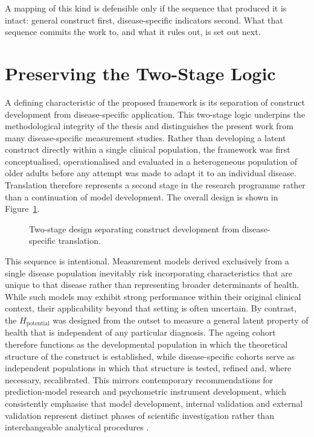 A mapping of this kind is defensible only if the sequence that produced it is
intact: general construct first, disease-specific indicators second. What that
sequence commits the work to, and what it rules out, is set out next.

\section{Preserving the Two-Stage Logic}
\label{sec:two_stage}

\noindent A defining characteristic of the proposed framework is its separation of construct development from disease-specific application. This two-stage logic underpins the methodological integrity of the thesis and distinguishes the present work from many disease-specific measurement studies. Rather than developing a latent construct directly within a single clinical population, the framework was first conceptualised, operationalised and evaluated in a heterogeneous population of older adults before any attempt was made to adapt it to an individual disease. Translation therefore represents a second stage in the research programme rather than a continuation of model development. The overall design is shown in Figure~\ref{fig:two_stage}.

\begin{figure}[htbp]
\centering

\captionsetup{justification=justified, width=\linewidth}
\caption{Two-stage design separating construct development from disease-specific translation.}
\label{fig:two_stage}
\end{figure}

This sequence is intentional. Measurement models derived exclusively from a single disease population inevitably risk incorporating characteristics that are unique to that disease rather than representing broader determinants of health. While such models may exhibit strong performance within their original clinical context, their applicability beyond that setting is often uncertain. By contrast, the $H_{\text{potential}}$ was designed from the outset to measure a general latent property of health that is independent of any particular diagnosis. The ageing cohort therefore functions as the developmental population in which the theoretical structure of the construct is established, while disease-specific cohorts serve as independent populations in which that structure is tested, refined and, where necessary, recalibrated. This mirrors contemporary recommendations for prediction-model research and psychometric instrument development, which consistently emphasise that model development, internal validation and external validation represent distinct phases of scientific investigation rather than interchangeable analytical procedures \citep{moons_2019,collins_2024,steyerberg_2019}.

